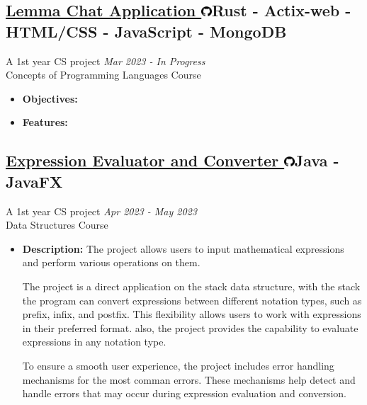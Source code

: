\documentclass[a4paper,12pt]{article}
\newcommand{\projectTitle}[3]{%
    \subsection{\href{#2}{#1 \includegraphics[height=11pt]{images/github-logo.png}}\textmd{\hfill \normalsize{#3}}}
}
\begin{document}
		\projectTitle{Lemma Chat Application}{https://github.com/OmarMGaber/Lemma-Chat-App}{Rust - Actix-web - \small{HTML/CSS} - JavaScript - MongoDB}
			\vspace{-3mm}
			A 1st year CS project \hfill \small\textit{Mar 2023 - In Progress}\\
			Concepts of Programming Languages Course
			\begin{itemize}
				\item{\textbf{Objectives: } }
				\item{
					\textbf{Features: }
				}
			\end{itemize}
		
		\projectTitle{Expression Evaluator and Converter}{https://github.com/OmarMGaber/Turing-Machine-Simulator}{Java - JavaFX}
			\vspace{-3mm}
			A 1st year CS project \hfill \small\textit{Apr 2023 - May 2023}\\
			Data Structures Course
			\begin{itemize}
				\item{\textbf{Description: }The project allows users to input mathematical expressions and perform various operations on them.

The project is a direct application on the stack data structure, with the stack the program can convert expressions between different notation types, such as prefix, infix, and postfix. This flexibility allows users to work with expressions in their preferred format.
also, the project provides the capability to evaluate expressions in any notation type.

To ensure a smooth user experience, the project includes error handling mechanisms for the most comman errors. These mechanisms help detect and handle errors that may occur during expression evaluation and conversion. }
			\end{itemize}	
\end{document}
